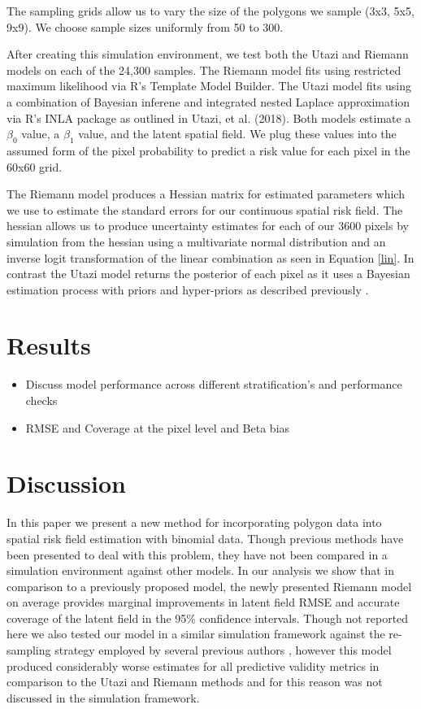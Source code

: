 \documentclass{article}
\begin{document}
The sampling grids allow us to vary the size of the polygons we sample (3x3, 5x5, 9x9). We choose sample sizes uniformly from 50 to 300.

After creating this simulation environment, we test both the Utazi and Riemann models on each of the 24,300 samples. The Riemann model fits using restricted maximum likelihood via R's Template Model Builder. The Utazi model fits using a combination of Bayesian inferene and integrated nested Laplace approximation via R's INLA package as outlined in Utazi, et al. (2018). Both models estimate a $\beta_0$ value, a  $\beta_1$ value, and the latent spatial field. We plug these values into the assumed form of the pixel probability to predict a risk value for each pixel in the 60x60 grid. 

The Riemann model produces a Hessian matrix for estimated parameters which we use to estimate the standard errors for our continuous spatial risk field. The hessian allows us to produce uncertainty estimates for each of our 3600 pixels by simulation from the hessian using a multivariate normal distribution and an inverse logit transformation of the linear combination as seen in Equation \ref{lin}. In contrast the Utazi model returns the posterior of each pixel as it uses a Bayesian estimation process with priors and hyper-priors as described previously \cite{Utazi2018a}.

\section{Results}\label{results}

\begin{itemize}
\item  Discuss model performance across different stratification's and performance checks
\item RMSE and Coverage at the pixel level and Beta bias
\end{itemize}

\section{Discussion}\label{discussion}

In this paper we present a new method for incorporating polygon data into spatial risk field estimation with binomial data. Though previous methods have been presented to deal with this problem, they have not been compared in a simulation environment against other models. In our analysis we show that in comparison to a previously proposed model, the newly presented Riemann model on average provides marginal improvements in latent field RMSE and accurate coverage of the latent field in the 95\% confidence intervals. Though not reported here we also tested our model in a similar simulation framework against the re-sampling strategy employed by several previous authors \cite{Golding2017, Reiner2018}, however this model produced considerably worse estimates for all predictive validity metrics in comparison to the Utazi and Riemann methods and for this reason was not discussed in the simulation framework.  
\end{document}
